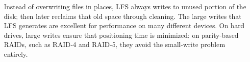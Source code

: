 \begin{tcolorbox}[left=0mm, top=0mm, right=0mm, rightlower=0mm, bottom=0mm,
  before skip balanced=1mm, after skip balanced=0mm,
  title=Summry: LFS writes large and faster but needs collect garbage,
  halign title=center]
  Instead of overwriting files in places, LFS always writes to unused portion of the
disk; then later reclaims that old space through cleaning. The large writes that LFS generates are excellent for performance on many different devices. On hard drives, large writes ensure that positioning time is minimized; on parity-based RAIDs, such as RAID-4 and RAID-5, they avoid the small-write problem entirely.
\end{tcolorbox}
